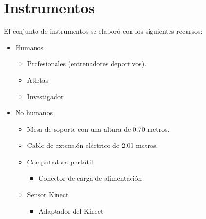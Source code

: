 \section{Instrumentos}\label{ins}
El conjunto de instrumentos se elabor\'o con los  siguientes recursos:
\begin{itemize}
\item Humanos
	\begin{itemize}
	\item Profesionales (entrenadores deportivos).
	\item Atletas
	\item Investigador
	\end{itemize}
\item No humanos
	\begin{itemize}
	\item Mesa de soporte con una altura de 0.70 metros.
	\item Cable de extensi\'on el\'ectrico de 2.00 metros. 
	\item Computadora port\'atil
		\begin{itemize}
		\item Conector de carga de alimentaci\'on
		\end{itemize}
	\item Sensor Kinect
		\begin{itemize}
		\item Adaptador del Kinect
		\end{itemize}
	\end{itemize}
\end{itemize}
